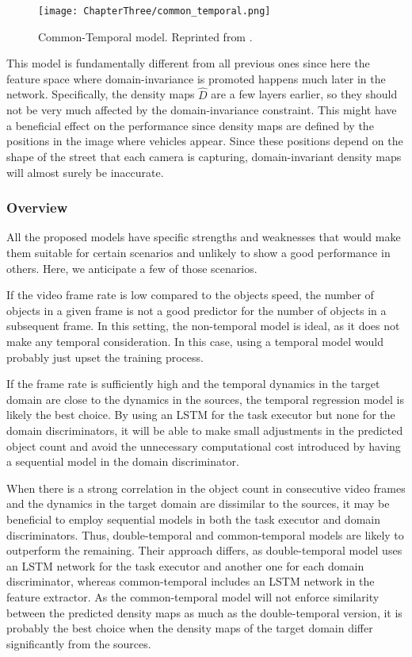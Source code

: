 \begin{figure}[!ht]
	\centering
	\texttt{[image: ChapterThree/common\_temporal.png]}
	\caption{Common-Temporal model. Reprinted from \citet{ThesisFrancisco}.}
	\label{fig:common_temporal_model}
\end{figure}

This model is fundamentally different from all previous ones since here the feature space where domain-invariance is promoted happens much later in the network. Specifically, the density maps $\widehat{D}$ are a few layers earlier, so they should not be very much affected by the domain-invariance constraint. This might have a beneficial effect on the performance since density maps are defined by the positions in the image where vehicles appear. Since these positions depend on the shape of the street that each camera is capturing, domain-invariant density maps will almost surely be inaccurate.

\subsubsection{Overview}

All the proposed models have specific strengths and weaknesses that would make them suitable for certain scenarios and unlikely to show a good performance in others. Here, we anticipate a few of those scenarios.

If the video frame rate is low compared to the objects speed, the number of objects in a given frame is not a good predictor for the number of objects in a subsequent frame. In this setting, the non-temporal model is ideal, as it does not make any temporal consideration. In this case, using a temporal model would probably just upset the training process.

If the frame rate is sufficiently high and the temporal dynamics in the target domain are close to the dynamics in the sources, the temporal regression model is likely the best choice. By using an LSTM for the task executor but none for the domain discriminators, it will be able to make small adjustments in the predicted object count and avoid the unnecessary computational cost introduced by having a sequential model in the domain discriminator.

When there is a strong correlation in the object count in consecutive video frames and the dynamics in the target domain are dissimilar to the sources, it may be beneficial to employ sequential models in both the task executor and domain discriminators. Thus, double-temporal and common-temporal models are likely to outperform the remaining. Their approach differs, as double-temporal model uses an LSTM network for the task executor and another one for each domain discriminator, whereas common-temporal includes an LSTM network in the feature extractor. As the common-temporal model will not enforce similarity between the predicted density maps as much as the double-temporal version, it is probably the best choice when the density maps of the target domain differ significantly from the sources.

